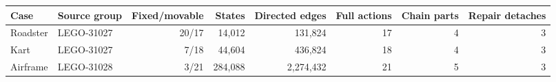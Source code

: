 \begin{tabular}{llrrrrrr}\toprule
Case & Source group & Fixed/movable & States & Directed edges & Full actions & Chain parts & Repair detaches\\\midrule
Roadster & LEGO-31027 & 20/17 & 14,012 & 131,824 & 17 & 4 & 3\\
Kart & LEGO-31027 & 7/18 & 44,604 & 436,824 & 18 & 4 & 3\\
Airframe & LEGO-31028 & 3/21 & 284,088 & 2,274,432 & 21 & 5 & 3\\
\bottomrule\end{tabular}
